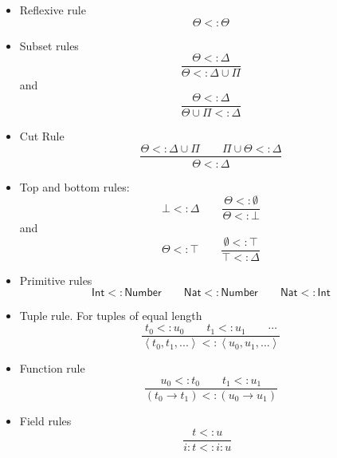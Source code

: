 \documentclass[12pt]{article}
\begin{document}
\begin{itemize}
\item Reflexive rule%
\begin{equation*}
\Theta <:\Theta
\end{equation*}

\item Subset rules%
\begin{equation*}
\frac{\Theta <:\Delta }{\Theta <:\Delta \cup \Pi }
\end{equation*}%
and%
\begin{equation*}
\frac{\Theta <:\Delta }{\Theta \cup \Pi <:\Delta }
\end{equation*}

\item Cut Rule%
\begin{equation*}
\frac{\Theta <:\Delta \cup \Pi \qquad \Pi \cup \Theta <:\Delta }{\Theta
<:\Delta }
\end{equation*}

\item Top and bottom rules:%
\begin{equation*}
\bot <:\Delta \qquad \frac{\Theta <:\emptyset }{\Theta <:\bot }
\end{equation*}%
and%
\begin{equation*}
\Theta <:\top \qquad \frac{\emptyset <:\top }{\top <:\Delta }
\end{equation*}

\item Primitive rules%
\begin{equation*}
\mathsf{Int}<:\mathsf{Number}\qquad \mathsf{Nat}<:\mathsf{Number}\qquad 
\mathsf{Nat}<:\mathsf{Int}
\end{equation*}

\item Tuple rule. For tuples of equal length%
\begin{equation*}
\frac{t_{0}<:u_{0}\qquad t_{1}<:u_{1}\qquad \cdots }{\left\langle
t_{0},t_{1},...\right\rangle <:\left\langle u_{0},u_{1},...\right\rangle }
\end{equation*}

\item Function rule%
\begin{equation*}
\frac{u_{0}\mathsf{<:}t_{0}\qquad t_{1}\mathsf{<:}u_{1}}{\left(
t_{0}\rightarrow t_{1}\right) <:\left( u_{0}\rightarrow u_{1}\right) }
\end{equation*}

\item Field rules%
\begin{equation*}
\frac{t<:u}{i\colon t<:i\colon u}\text{ }
\end{equation*}


\end{itemize}
\end{document}

